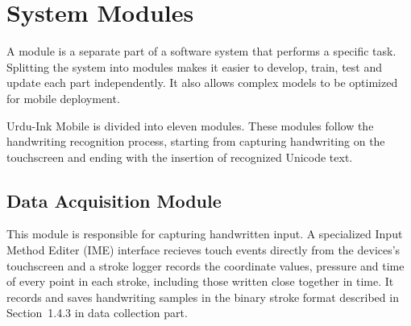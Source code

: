 \documentclass[12pt,a4paper]{report}
\begin{document}
\section{System Modules}
A module is a separate part of a software system that performs a specific task. Splitting the system into modules makes it easier to develop, train, test and update each part independently. It also allows complex models to be optimized for mobile deployment.

Urdu-Ink Mobile is divided into eleven modules. These modules follow the handwriting recognition process, starting from capturing handwriting on the touchscreen and ending with the insertion of recognized Unicode text.

\subsection{Data Acquisition Module}
This module is responsible for capturing handwritten input. A specialized Input Method Editer (IME) interface recieves touch events directly from the devices's touchscreen and a stroke logger records the coordinate values, pressure and time of every point in each stroke, including those written close together in time. It records and saves handwriting samples in the binary stroke format described in Section~1.4.3 in data collection part. 
\end{document}
